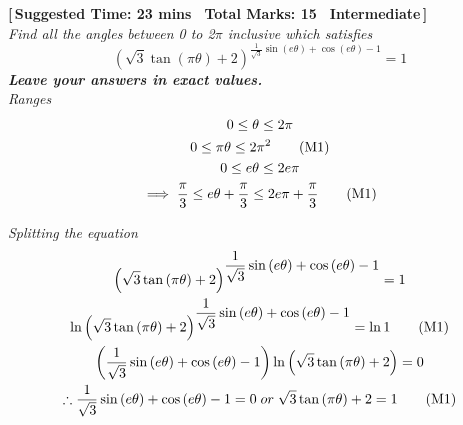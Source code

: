 \textbf{\hypertarget{P4}{[\,Suggested Time: 23 mins \textbar \, Total Marks: 15 \textbar \, Intermediate\,]}}\\
    \textit{Find all the angles between 0 to 2\(\pi\) inclusive which satisfies}
    \begin{equation*}
    \displaystyle\left(\sqrt{3}\tan{(\pi\theta)}+2\right)^{\displaystyle\frac{1}{\sqrt{3}}\sin{(e\theta)}+\cos{(e\theta)}-1}=1
    \end{equation*}
    \textit{\textbf{Leave your answers in exact values.}} \\



\textit{Ranges}
\begin{gather*}
    0\le\theta\le2\pi \nonumber\\
    0\le\pi\theta\le2\pi^{2} \onemark \\
    0\le e\theta\le2e\pi \nonumber\\
    \implies\frac{\pi}{3}\le e\theta+\frac{\pi}{3}\le2e\pi+\frac{\pi}{3} \onemark \\
\end{gather*}

\textit{Splitting the equation}
\begin{gather*}
    \displaystyle\left(\sqrt{3}\tan{(\pi\theta)}+2\right)^{\displaystyle\frac{1}{\sqrt{3}}\sin{(e\theta)}+\cos{(e\theta)}-1} = 1\\
    \displaystyle\ln\left(\sqrt{3}\tan{(\pi\theta)}+2\right)^{\displaystyle\frac{1}{\sqrt{3}}\sin{(e\theta)}+\cos{(e\theta)}-1} = \ln 1 \onemark \\
    \displaystyle\left(\frac{1}{\sqrt{3}}\sin{(e\theta)}+\cos{(e\theta)}-1\right)\ln\left(\sqrt{3}\tan{(\pi \theta)}+2\right) = 0\\
    \therefore
    \displaystyle\frac{1}{\sqrt{3}}\sin{(e\theta)}+\cos{(e\theta)}-1=0 %
    \; or \;
    \sqrt{3}\tan{(\pi \theta)}+2 = 1 \onemark \\ %
\end{gather*}

